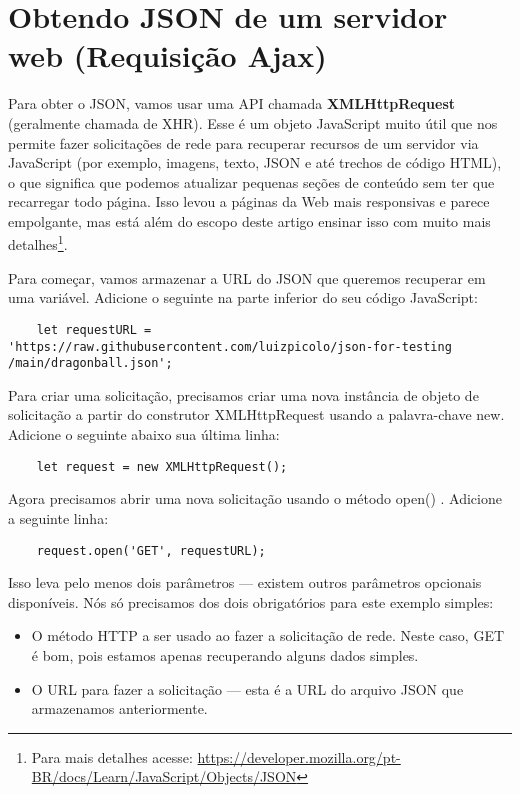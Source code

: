 \section{Obtendo JSON de um servidor web (Requisição Ajax)}

Para obter o JSON, vamos usar uma API chamada \textbf{XMLHttpRequest} (geralmente chamada de XHR). Esse é um objeto JavaScript muito útil que nos permite fazer solicitações de rede para recuperar recursos de um servidor via JavaScript (por exemplo, imagens, texto, JSON e até trechos de código HTML), o que significa que podemos atualizar pequenas seções de conteúdo sem ter que recarregar todo página. Isso levou a páginas da Web mais responsivas e parece empolgante, mas está além do escopo deste artigo ensinar isso com muito mais detalhes\footnote{Para mais detalhes acesse: \url{https://developer.mozilla.org/pt-BR/docs/Learn/JavaScript/Objects/JSON}}.

Para começar, vamos armazenar a URL do JSON que queremos recuperar em uma variável. Adicione o seguinte na parte inferior do seu código JavaScript:

\begin{lstlisting}
	let requestURL = 'https://raw.githubusercontent.com/luizpicolo/json-for-testing
/main/dragonball.json';
\end{lstlisting}

Para criar uma solicitação, precisamos criar uma nova instância de objeto de solicitação a partir do construtor XMLHttpRequest usando a palavra-chave new. Adicione o seguinte abaixo sua última linha:

\begin{lstlisting}
	let request = new XMLHttpRequest();
\end{lstlisting}

Agora precisamos abrir uma nova solicitação usando o método open() . Adicione a seguinte linha:

\begin{lstlisting}
	request.open('GET', requestURL);
\end{lstlisting}

Isso leva pelo menos dois parâmetros — existem outros parâmetros opcionais disponíveis. Nós só precisamos dos dois obrigatórios para este exemplo simples:

\begin{itemize}
	\item O método HTTP a ser usado ao fazer a solicitação de rede. Neste caso, GET é bom, pois estamos apenas recuperando alguns dados simples.
	\item O URL para fazer a solicitação — esta é a URL do arquivo JSON que armazenamos anteriormente.
\end{itemize}

